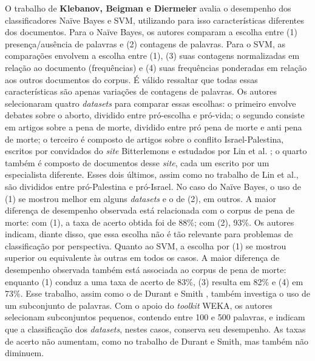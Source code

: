 O trabalho de \textbf{Klebanov, Beigman e Diermeier} avalia o desempenho dos classificadores Naïve Bayes e SVM, utilizando para isso características diferentes dos documentos. Para o Naïve Bayes, os autores comparam a escolha entre (1) presença/ausência de palavras e (2) contagens de palavras. Para o SVM, as comparações envolvem a escolha entre (1), (3) suas contagens normalizadas em relação ao documento (frequências) e (4) suas frequências ponderadas em relação aos outros documentos do corpus. É válido ressaltar que todas essas características são apenas variações de contagens de palavras. Os autores selecionaram quatro \emph{datasets} para comparar essas escolhas: o primeiro envolve debates sobre o aborto, dividido entre pró-escolha e pró-vida; o segundo consiste em artigos sobre a pena de morte, dividido entre pró pena de morte e anti pena de morte; o terceiro é composto de artigos sobre o conflito Israel-Palestina, escritos por convidados do \emph{site} Bitterlemons e estudados por Lin et al. \cite{lin-et-al2006}; o quarto também é composto de documentos desse \emph{site}, cada um escrito por um especialista diferente. Esses dois últimos, assim como no trabalho de Lin et al., são divididos entre pró-Palestina e pró-Israel.  No caso do Naïve Bayes, o uso de (1) se mostrou melhor em alguns \emph{datasets} e o de (2), em outros. A maior diferença de desempenho observada está relacionada com o corpus de pena de morte: com (1), a taxa de acerto obtida foi de 88\%; com (2), 93\%. Os autores indicam, diante disso, que essa escolha não é tão relevante para problemas de classificação por perspectiva. Quanto ao SVM, a escolha por (1) se mostrou superior ou equivalente às outras em todos os casos. A maior diferença de desempenho observada também está associada ao corpus de pena de morte: enquanto (1) conduz a uma taxa de acerto de 83\%, (3) resulta em 82\% e (4) em 73\%. Esse trabalho, assim como o de Durant e Smith \cite{durant-smith}, também investiga o uso de um subconjunto de palavras. Com o apoio do \emph{toolkit} WEKA, os autores selecionam subconjuntos pequenos, contendo entre 100 e 500 palavras, e indicam que a classificação dos \emph{datasets}, nestes casos, conserva seu desempenho. As taxas de acerto não aumentam, como no trabalho de Durant e Smith, mas também não diminuem.






